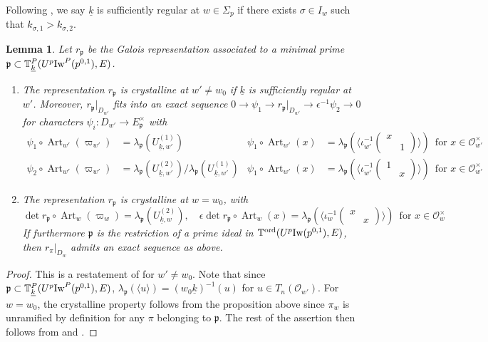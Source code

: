 \documentclass[leqno]{amsart}
\newtheorem{lem}[thm]{Lemma}
\theoremstyle{definition}
\theoremstyle{remark}
\newcommand{\oo}{\mathcal{O}}
\DeclareMathOperator{\Art}{Art}
\newcommand{\fp}{\mathfrak{p}}
\newcommand{\wt}[1]{\underline{ #1 }}
\newcommand{\Iw}{\textnormal{Iw}} %
\newcommand{\TT}{\mathbb{T}} %
\newcommand{\ord}{\textnormal{ord}} %
\begin{document}
Following \cite{ger},
we say $\wt{k}$ is sufficiently regular
at $w\in \Sigma_p$
if there exists  $\sigma\in I_{w}$
such that  $k_{\sigma,1}>k_{\sigma,2}$.
\begin{lem}\label{lem:galois_at_p}
	Let $r_{\fp}$ be the Galois representation
	associated to a minimal prime
	$\fp\subset \TT^P_{\wt{k}}(U^p\Iw^P(p^{0,1}),E)$.
	\begin{enumerate}[label=(\alph*)]
	\item The representation $r_\fp$ is crystalline at $w'\neq w_0$
	if $\wt{k}$ is sufficiently regular at $w'$.
	Moreover, $r_\fp\vert_{D_{w'}}$ 
	fits into an exact sequence
	$0\to \psi_1\to r_{\fp}\vert_{D_{w'}} \to \epsilon^{-1}\psi_2\to 0$
	for characters $\psi_i\colon D_{w'}\to E_{\fp}^{\times}$ with
	\begin{equation}\label{eq:Gal_hecke_at_p'}
	\begin{aligned}
		\psi_1\circ \Art_{w'}(\varpi_{w'})&=
		\lambda_{\fp}(U_{\wt{k},w'}^{(1)}) &
		\psi_1\circ \Art_{w'}(x)&=
		\lambda_{\fp}
		(\langle 
		\iota_{w'}^{-1}
		(\begin{smallmatrix}
			x&\\&1
		\end{smallmatrix})
		\rangle)\, \text{ for }x\in \oo_{w'}^{\times}\\
		\psi_2\circ \Art_{w'}(\varpi_{w'})&=
		\lambda_{\fp}(U_{\wt{k},w'}^{(2)})/
		\lambda_{\fp}(U_{\wt{k},w'}^{(1)}) &
		\psi_1\circ \Art_{w'}(x)&=
		\lambda_{\fp}
		(\langle 
		\iota_{w'}^{-1}
		(\begin{smallmatrix}
			1&\\&x
		\end{smallmatrix})
		\rangle)\, \text{ for }x\in \oo_{w'}^{\times}
	\end{aligned}
	\end{equation}
	\item The representation $r_\fp$ is 
	crystalline at $w=w_0$, with 
	\begin{equation}\label{eq:Gal_hecke_at_p}
	\det r_\fp\circ \Art_w(\varpi_w)=
	\lambda_{\fp}(U_{\wt{k},w}^{(2)}),\quad
	\epsilon\det r_\fp\circ \Art_w(x)=
	\lambda_{\fp}
	(\langle 
	\iota_{w}^{-1}
	(\begin{smallmatrix}
		x&\\&x
	\end{smallmatrix})
	\rangle)\, \text{ for }x\in \oo_{w}^{\times}
	\end{equation}
	If furthermore $\fp$ is the restriction
	of a prime ideal in 
	$\TT^{\ord}(U^p\Iw(p^{0,1}),E)$,
	then $r_\pi\vert_{D_w}$ 
	admits an exact sequence as above.
	\end{enumerate}
\end{lem}
\begin{proof}
This is a restatement of \cite[Cor 2.33]{ger}
for $w'\neq w_0$.
Note that since $\fp\subset \TT_{\wt{k}}^P(U^p\Iw^P(p^{0,1}),E)$,
$\lambda_\fp(\langle u\rangle)=(w_0\wt{k})^{-1}(u)$ for 
$u\in T_n(\oo_{w'})$.
For $w=w_0$, the crystalline property
follows from the proposition above since $\pi_w$ is unramified 
by definition for any $\pi$ belonging to $\fp$.
The rest of the assertion then follows from 
\cite[Lem 2.31]{ger} and \cite[Cor 2.33]{ger}.
\end{proof}
\end{document}
